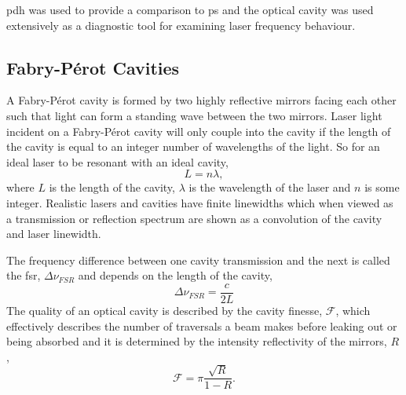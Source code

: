 \Gls{pdh} was used to provide a comparison to \gls{ps} and the optical cavity was used extensively as a diagnostic tool for examining laser frequency behaviour.

\subsection{Fabry-P\'erot Cavities}\label{section:cavity_theory}
A Fabry-P\'erot cavity is formed by two highly reflective mirrors facing each other such that light can form a standing wave between the two mirrors.
Laser light incident on a Fabry-P\'erot cavity will only couple into the cavity if the length of the cavity is equal to an integer number of wavelengths of the light.
So for an ideal laser to be resonant with an ideal cavity,
\begin{equation}
L = n \lambda,
\end{equation}
where $L$ is the length of the cavity, $\lambda$ is the wavelength of the laser and $n$ is some integer.
Realistic lasers and cavities have finite linewidths which when viewed as a transmission or reflection spectrum are shown as a convolution of the cavity and laser linewidth.

The frequency difference between one cavity transmission and the next is called the \gls{fsr}, $\Delta \nu_{FSR}$ and depends on the length of the cavity,
\begin{equation}
\Delta \nu_{FSR} = \frac{c}{2L}
\end{equation}
The quality of an optical cavity is described by the cavity finesse, $\mathscr{F}$, which effectively describes the number of traversals a beam makes before leaking out or being absorbed and it is determined by the intensity reflectivity of the mirrors, $R$,~\cite{hecht_optics_1987}
\begin{equation}
\mathscr{F} = \pi\frac{\sqrt{R}}{1-R}.
\end{equation}

